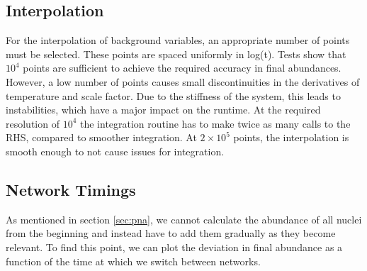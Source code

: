 \subsection{Interpolation}
\label{sec:interpolation}
For the interpolation of background variables, an appropriate number of points must be selected. These points are spaced uniformly in log(t). Tests show that $10^4$ points are sufficient to achieve the required accuracy in final abundances. However, a low number of points causes small discontinuities in the derivatives of temperature and scale factor. Due to the stiffness of the system, this leads to instabilities, which have a major impact on the runtime. At the required resolution of $10^4$ the integration routine has to make twice as many calls to the RHS, compared to smoother integration. At $2\times 10^5$ points, the interpolation is smooth enough to not cause issues for integration.


\subsection{Network Timings}
\label{sec:networktiming}
As mentioned in section \ref{sec:pna}, we cannot calculate the abundance of all nuclei from the beginning and instead have to add them gradually as they become relevant. To find this point, we can plot the deviation in final abundance as a function of the time at which we switch between networks.

